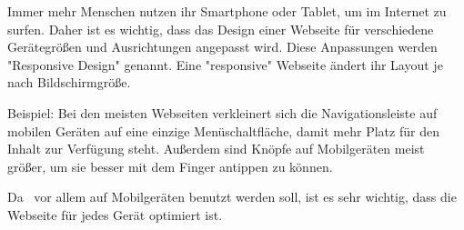 
Immer mehr Menschen nutzen ihr Smartphone oder Tablet, um im Internet zu surfen. 
Daher ist es wichtig, dass das Design einer Webseite für verschiedene Gerätegrößen und Ausrichtungen angepasst wird. 
Diese Anpassungen werden "Responsive Design" genannt. 
Eine "responsive" Webseite ändert ihr Layout je nach Bildschirmgröße. \cite{MDNResponsiveDesign}

Beispiel: 
Bei den meisten Webseiten verkleinert sich die Navigationsleiste auf mobilen Geräten auf eine einzige Menüschaltfläche, damit mehr Platz für den Inhalt zur Verfügung steht.
Außerdem sind Knöpfe auf Mobilgeräten meist größer, um sie besser mit dem Finger antippen zu können. 

Da \ZELIA\ vor allem auf Mobilgeräten benutzt werden soll, ist es sehr wichtig, dass die Webseite für jedes Gerät optimiert ist. 

